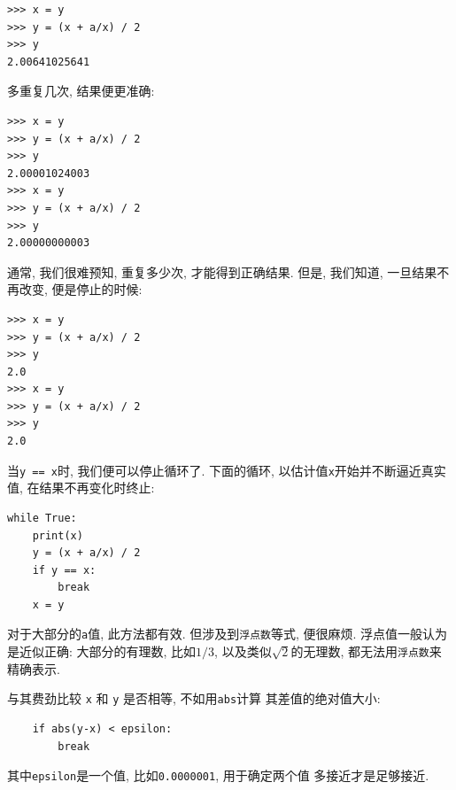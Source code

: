 \documentclass[10pt]{book}
\begin{document}
\begin{verbatim}
>>> x = y
>>> y = (x + a/x) / 2
>>> y
2.00641025641
\end{verbatim}
多重复几次, 结果便更准确:

\begin{verbatim}
>>> x = y
>>> y = (x + a/x) / 2
>>> y
2.00001024003
>>> x = y
>>> y = (x + a/x) / 2
>>> y
2.00000000003
\end{verbatim}
通常, 我们很难预知, 重复多少次, 才能得到正确结果. 
但是, 我们知道, 一旦结果不再改变, 便是停止的时候:

\begin{verbatim}
>>> x = y
>>> y = (x + a/x) / 2
>>> y
2.0
>>> x = y
>>> y = (x + a/x) / 2
>>> y
2.0
\end{verbatim}
当{\tt y == x}时, 我们便可以停止循环了. 
下面的循环, 以估计值{\tt x}开始并不断逼近真实值, 在结果不再变化时终止:

\begin{verbatim}
while True:
    print(x)
    y = (x + a/x) / 2
    if y == x:
        break
    x = y
\end{verbatim}
对于大部分的{\tt a}值, 此方法都有效. 
但涉及到{\tt 浮点数}等式, 便很麻烦. 
浮点值一般认为是近似正确:
大部分的有理数, 比如$1/3$, 
以及类似$\sqrt{2}$的无理数, 都无法用{\tt 浮点数}来精确表示. 

与其费劲比较 {\tt x} 和 {\tt y} 是否相等, 不如用{\tt abs}计算
其差值的绝对值大小:

\begin{verbatim}
    if abs(y-x) < epsilon:
        break
\end{verbatim}
其中\verb"epsilon"是一个值, 比如{\tt 0.0000001}, 用于确定两个值
多接近才是足够接近. 
\end{document}
